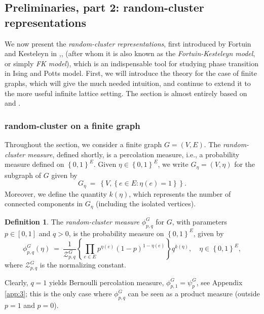 \documentclass[12pt]{article}
\newcommand{\ZZ}{\mathcal{Z}}
\newcommand{\set}[1]{\left\{#1\right\}}
\newcommand{\1}{\mathbbm{1}}
\newcommand{\5}{\vspace{0.5cm}}
\theoremstyle{definition}
\newtheorem{df}[thm]{Definition}
\begin{document}

\subsection{Preliminaries, part 2: random-cluster representations}\label{sec:RandomCluster}

We now present the \textit{random-cluster representations}, first introduced by Fortuin and Kesteleyn in \cite{FK},\cite{For1},\cite{For2} (after whom it is also known as the \textit{Fortuin-Kesteleyn model}, or simply \textit{FK model}), which is an indispensable tool for studying phase transition in Ising and Potts model. First, we will introduce the theory for the case of finite graphs, which will give the much needed intuition, and continue to extend it to the more useful infinite lattice setting. The section is almost entirely based on \cite{GHM} and \cite{Gri}.


\subsubsection{random-cluster on a finite graph}

Throughout the section, we consider a finite graph $G=(V,E)$. The \textit{random-cluster measure}, defined shortly, is a percolation measure, i.e., a probability measure defined on $\set{0,1}^E$. Given $\eta\in\set{0,1}^E$, we write $G_\eta=(V,\eta)$ for the subgraph of $G$ given by 
$$G_\eta ~=~ \set{V,\set{e\in E:\eta(e)=1}}.$$
Moreover, we define the quantity $k(\eta)$, which represents the number of connected components in $G_\eta$ (including the isolated vertices). 

\begin{df}
The \textit{random-cluster measure} $\phi_{p,q}^G$ for $G$, with parameters $p\in[0,1]$ and $q>0$, is the probability measure on $\set{0,1}^E$, given by
$$\phi_{p,q}^{G}(\eta) ~=~ \frac{1}{\ZZ_{p,q}^G}\set{\prod_{e\in E}p^{\eta(e)}(1-p)^{1-\eta(e)}}q^{k(\eta)}, \quad \eta\in\set{0,1}^E,$$
where $\ZZ_{p,q}^{G}$ is the normalizing constant.
\end{df} 

Clearly, $q=1$ yields Bernoulli percolation measure, $\phi_{p,1}^G=\psi_{p}^G$, see Appendix \ref{app:3}; this is the only case where $\phi_{p,q}^G$ can be seen as a product measure (outside $p=1$ and $p=0$). \\
\end{document}
